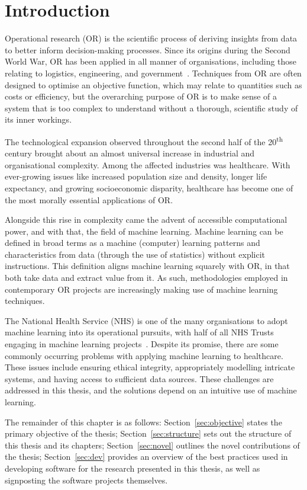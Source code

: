 \chapter{Introduction}
\label{chp:intro}

Operational research (OR) is the scientific process of deriving insights from
data to better inform decision-making processes. Since its origins during the
Second World War, OR has been applied in all manner of organisations, including
those relating to logistics, engineering, and government~\cite{Hillier2005}.
Techniques from OR are often designed to optimise an objective function, which
may relate to quantities such as costs or efficiency, but the overarching
purpose of OR is to make sense of a system that is too complex to understand
without a thorough, scientific study of its inner workings.

The technological expansion observed throughout the second half of the
20\textsuperscript{th} century brought about an almost universal increase in
industrial and organisational complexity. Among the affected industries was
healthcare. With ever-growing issues like increased population size and density,
longer life expectancy, and growing socioeconomic disparity, healthcare has
become one of the most morally essential applications of OR.

Alongside this rise in complexity came the advent of accessible computational
power, and with that, the field of machine learning. Machine learning can be
defined in broad terms as a machine (computer) learning patterns and
characteristics from data (through the use of statistics) without explicit
instructions. This definition aligns machine learning squarely with OR, in that
both take data and extract value from it. As such, methodologies employed in
contemporary OR projects are increasingly making use of machine learning
techniques.

The National Health Service (NHS) is one of the many organisations to adopt
machine learning into its operational pursuits, with half of all NHS Trusts
engaging in machine learning projects~\cite{Hughes2019}. Despite its promise,
there are some commonly occurring problems with applying machine learning to
healthcare. These issues include ensuring ethical integrity, appropriately
modelling intricate systems, and having access to sufficient data sources. These
challenges are addressed in this thesis, and the solutions depend on an
intuitive use of machine learning.

The remainder of this chapter is as follows: Section~\ref{sec:objective} states
the primary objective of the thesis; Section~\ref{sec:structure} sets out
the structure of this thesis and its chapters; Section~\ref{sec:novel} outlines
the novel contributions of the thesis; Section~\ref{sec:dev} provides an
overview of the best practices used in developing software for the research
presented in this thesis, as well as signposting the software projects
themselves.


